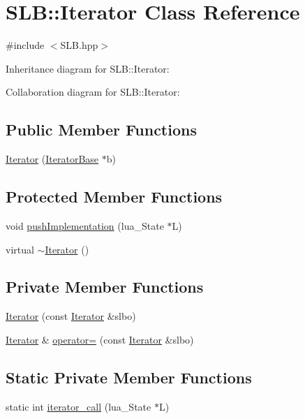 \hypertarget{classSLB_1_1Iterator}{}\section{S\+LB\+:\+:Iterator Class Reference}
\label{classSLB_1_1Iterator}


{\ttfamily \#include $<$S\+L\+B.\+hpp$>$}



Inheritance diagram for S\+LB\+:\+:Iterator\+:


Collaboration diagram for S\+LB\+:\+:Iterator\+:
\subsection*{Public Member Functions}
\begin{DoxyCompactItemize}
\item 
\hyperlink{classSLB_1_1Iterator_aafb165730ffebf14d05cd2cf8f43d89f}{Iterator} (\hyperlink{classSLB_1_1IteratorBase}{Iterator\+Base} $\ast$b)
\end{DoxyCompactItemize}
\subsection*{Protected Member Functions}
\begin{DoxyCompactItemize}
\item 
void \hyperlink{classSLB_1_1Iterator_a84cca6f9a154b81582a6705446e0e6ad}{push\+Implementation} (lua\+\_\+\+State $\ast$L)
\item 
virtual \hyperlink{classSLB_1_1Iterator_acf7ec978e59a28f0314b8c543d334d2f}{$\sim$\+Iterator} ()
\end{DoxyCompactItemize}
\subsection*{Private Member Functions}
\begin{DoxyCompactItemize}
\item 
\hyperlink{classSLB_1_1Iterator_aa80dfeadcc52af93014638b0e09d7b4e}{Iterator} (const \hyperlink{classSLB_1_1Iterator}{Iterator} \&slbo)
\item 
\hyperlink{classSLB_1_1Iterator}{Iterator} \& \hyperlink{classSLB_1_1Iterator_a25195ee3869c1a365963fa5d2576b648}{operator=} (const \hyperlink{classSLB_1_1Iterator}{Iterator} \&slbo)
\end{DoxyCompactItemize}
\subsection*{Static Private Member Functions}
\begin{DoxyCompactItemize}
\item 
static int \hyperlink{classSLB_1_1Iterator_a07c19f1491d4290d7b8ce4fb61d5e9a9}{iterator\+\_\+call} (lua\+\_\+\+State $\ast$L)
\end{DoxyCompactItemize}
